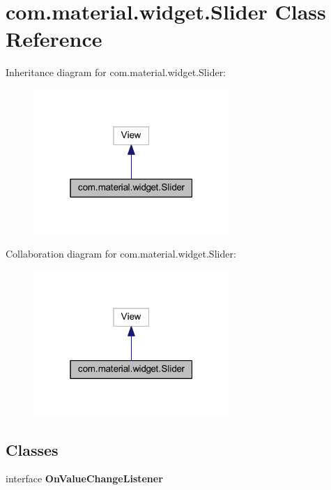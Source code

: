 \hypertarget{classcom_1_1material_1_1widget_1_1_slider}{}\section{com.\+material.\+widget.\+Slider Class Reference}
\label{classcom_1_1material_1_1widget_1_1_slider}


Inheritance diagram for com.\+material.\+widget.\+Slider\+:
\nopagebreak
\begin{figure}[H]
\begin{center}
\leavevmode
\includegraphics[width=211pt]{classcom_1_1material_1_1widget_1_1_slider__inherit__graph}
\end{center}
\end{figure}


Collaboration diagram for com.\+material.\+widget.\+Slider\+:
\nopagebreak
\begin{figure}[H]
\begin{center}
\leavevmode
\includegraphics[width=211pt]{classcom_1_1material_1_1widget_1_1_slider__coll__graph}
\end{center}
\end{figure}
\subsection*{Classes}
\begin{DoxyCompactItemize}
\item 
interface {\bfseries On\+Value\+Change\+Listener}
\end{DoxyCompactItemize}
